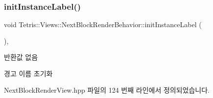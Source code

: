\subsubsection{\texorpdfstring{init\+Instance\+Label()}{initInstanceLabel()}}
{\footnotesize\ttfamily void Tetris\+::\+Views\+::\+Next\+Block\+Render\+Behavior\+::init\+Instance\+Label (\begin{DoxyParamCaption}{ }\end{DoxyParamCaption})\hspace{0.3cm}{\ttfamily [inline]}, {\ttfamily [protected]}}

\begin{DoxyReturn}{반환값}
없음 
\end{DoxyReturn}
\begin{DoxyWarning}{경고}
이름 초기화 
\end{DoxyWarning}


Next\+Block\+Render\+View.\+hpp 파일의 124 번째 라인에서 정의되었습니다.


